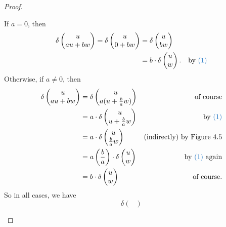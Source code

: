\begin{proof}
\begin{enumerate}
If \(a = 0\), then
\begin{align*}
    \delta \begin{pmatrix} u \\ au + bw \end{pmatrix}
    = \delta \begin{pmatrix} u \\ 0 + bw \end{pmatrix}
    & = \delta \begin{pmatrix} u \\ bw \end{pmatrix} \\
    & = b \cdot \delta \begin{pmatrix} u \\ w \end{pmatrix}. & \text{by \BLUE{(1)}}
\end{align*}
Otherwise, if \(a \ne 0\), then
\begin{align*}
    \delta \begin{pmatrix}
        u \\ au + bw
    \end{pmatrix}
    & = \delta \begin{pmatrix}
        u \\ a(u + \frac{b}{a}w)
    \end{pmatrix} & \text{of course} \\
    & = a \cdot \delta \begin{pmatrix}
        u \\ u + \frac{b}{a}w
    \end{pmatrix} & \text{by \BLUE{(1)}} \\
    & = a \cdot \delta \begin{pmatrix}
        u \\ \frac{b}{a}w
    \end{pmatrix} & \text{(indirectly) by Figure 4.5} \\
    & = a \left( \frac{b}{a} \right) \cdot \delta \begin{pmatrix}
        u \\ w
    \end{pmatrix} & \text{by \BLUE{(1)} again} \\
    & = b \cdot \delta \begin{pmatrix}
        u \\ w
    \end{pmatrix} & \text{of course}.
\end{align*}
So in all cases, we have
\[
    \delta \begin{pmatrix}

\end{pmatrix}\]
\end{enumerate}
\end{proof}
